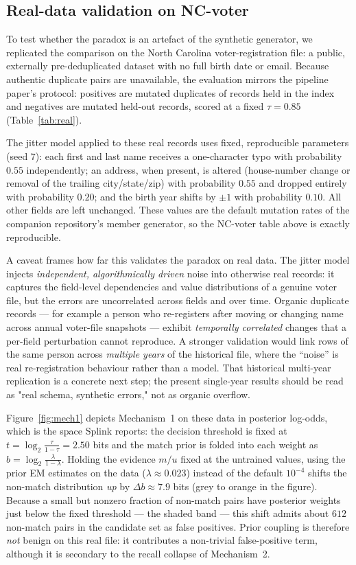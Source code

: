 \documentclass[11pt]{article}
\begin{document}
\subsection{Real-data validation on NC-voter}
\label{sec:real}
To test whether the paradox is an artefact of the synthetic generator, we replicated the
comparison on the North Carolina voter-registration file: a public, externally
pre-deduplicated dataset with no full birth date or email. Because authentic duplicate pairs
are unavailable, the evaluation mirrors the pipeline paper's protocol: positives are
mutated duplicates of records held in the index and negatives are mutated held-out records,
scored at a fixed $\tau=0.85$ (Table~\ref{tab:real}).

The jitter model applied to these real records uses fixed, reproducible parameters
(seed $7$): each first and last name receives a one-character typo with probability $0.55$
independently; an address, when present, is altered (house-number change or removal of the
trailing city/state/zip) with probability $0.55$ and dropped entirely with probability
$0.20$; and the birth year shifts by $\pm1$ with probability $0.10$. All other fields are
left unchanged. These values are the default mutation rates of the companion repository's
member generator, so the NC-voter table above is exactly reproducible.

A caveat frames how far this validates the paradox on real data. The jitter model injects
\emph{independent, algorithmically driven} noise into otherwise real records: it captures the
field-level dependencies and value distributions of a genuine voter file, but the errors are
uncorrelated across fields and over time. Organic duplicate records --- for example a person
who re-registers after moving or changing name across annual voter-file snapshots --- exhibit
\emph{temporally correlated} changes that a per-field perturbation cannot reproduce. A
stronger validation would link rows of the same person across \emph{multiple years} of the
historical file, where the ``noise'' is real re-registration behaviour rather than a model.
That historical multi-year replication is a concrete next step; the present single-year
results should be read as "real schema, synthetic errors," not as organic overflow.

Figure~\ref{fig:mech1} depicts Mechanism~1 on these data in posterior log-odds, which is the
space Splink reports: the decision threshold is fixed at
$t=\log_2\frac{\tau}{1-\tau}=2.50$ bits and the match prior is folded into each weight as
$b=\log_2\frac{\lambda}{1-\lambda}$. Holding the evidence $m/u$ fixed at the untrained
values, using the prior EM estimates on the data ($\lambda\approx0.023$) instead of the
default $10^{-4}$ shifts the non-match distribution \emph{up} by $\Delta b\approx7.9$ bits
(grey to orange in the figure). Because a small but nonzero fraction of non-match pairs have
posterior weights just below the fixed threshold --- the shaded band --- this shift admits
about $612$ non-match pairs in the candidate set as false positives. Prior coupling is
therefore \emph{not} benign on this real file: it contributes a non-trivial false-positive
term, although it is secondary to the recall collapse of Mechanism~2.
\end{document}

